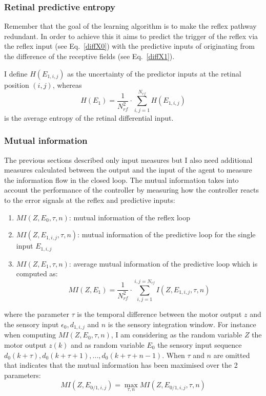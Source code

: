 \subsubsection{Retinal predictive entropy}
Remember that the goal of the learning algorithm is to make
the reflex pathway redundant. In order to achieve this
it aims to predict the trigger of the reflex via the reflex
input (see Eq.~\ref{diffX0})
with the predictive inputs of originating from the
difference of the receptive fields (see Eq.~\ref{diffX1}).

I define $H(E_{1,i,j})$ as the uncertainty of the predictor
inputs at the retinal position $(i,j)$, whereas 
\begin{equation}
H(E_{1})=\frac{1}{N_{rf}^2}\cdot \sum\limits_{i,j=1}^{N_{rf}} H(E_{1,i,j})
\end{equation}
is the average entropy of the retinal differential input.

\subsubsection{Mutual information}
\label{sec:MutualInfo}
The previous sections described only input measures but I also need additional
 measures calculated between the output and the input of the agent to measure
the information flow in the closed loop.
The mutual information takes into account the performance of the controller
by measuring how the controller reacts to the error signals at the
reflex and predictive inputs:
\begin{enumerate}
\item $MI(Z,E_0,\tau,n)$: mutual information of the reflex loop
\item $MI(Z,E_{1,i,j},\tau,n)$: mutual information of the predictive loop for
  the single input $E_{1,i,j}$
\item $MI(Z,E_1,\tau,n)$: average mutual information of the predictive loop
  which is computed as:
  \begin{equation}
    MI(Z,E_{1})=\frac{1}{N_{rf}^2}\cdot \sum\limits_{i,j=1}^{i,j=N_{rf}} I(Z,E_{1,i,j},\tau,n)
  \end{equation}
\end{enumerate}
where the parameter $\tau$ is the temporal difference between the motor output $z$ 
and the sensory input $\epsilon_0,d_{1,i,j}$ and $n$ is the sensory integration window.
For instance when computing $MI(Z,E_0,\tau,n)$, I am considering as the 
random variable $Z$ the motor output $z(k)$ and as random variable $E_0$ the
sensory input sequence $d_{0}(k+\tau),d_{0}(k+\tau+1),...,d_{0}(k+\tau+n-1)$. 
When $\tau$ and $n$ are omitted that indicates that the mutual information has been maximised 
over the 2 parameters:
\begin{equation}
MI(Z,E_{0/1,i,j})=\max_{\tau,n} MI(Z,E_{0/1,i,j},\tau,n)
\end{equation}

